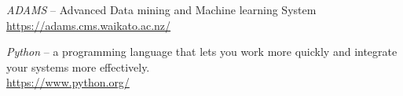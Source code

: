 %

\begin{thebibliography}{999}

		\textit{ADAMS} -- Advanced Data mining and Machine learning System \\
		\url{https://adams.cms.waikato.ac.nz/}{}

		\textit{Python} --  a programming language that lets you work more 
                quickly and integrate your systems more effectively. \\
		\url{https://www.python.org/}{}

\end{thebibliography}
